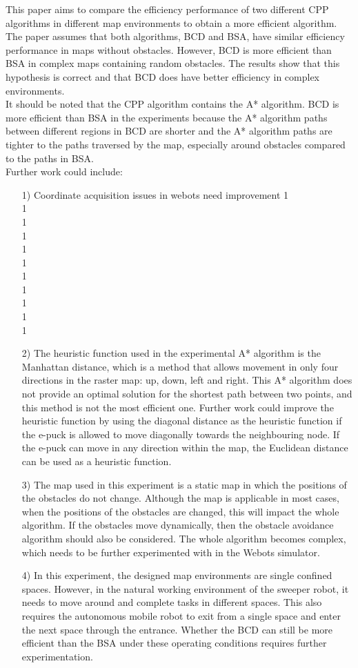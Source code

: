 \documentclass[conference]{IEEEtran}
\begin{document}
This paper aims to compare the efficiency performance of two different CPP algorithms in different map environments to obtain a more efficient algorithm. The paper assumes that both algorithms, BCD and BSA, have similar efficiency performance in maps without obstacles. However, BCD is more efficient than BSA in complex maps containing random obstacles. The results show that this hypothesis is correct and that BCD does have better efficiency in complex environments.\\
It should be noted that the CPP algorithm contains the A* algorithm. BCD is more efficient than BSA in the experiments because the A* algorithm paths between different regions in BCD are shorter and the A* algorithm paths are tighter to the paths traversed by the map, especially around obstacles compared to the paths in BSA.\\
Further work could include:
\begin{itemize}
  \item [1)] 
    Coordinate acquisition issues in webots need improvement
    1\\
    1\\
    1\\
    1\\
    1\\
    1\\
    1\\
    1\\
    1\\
    1\\
    1
  \item [2)]
    The heuristic function used in the experimental A* algorithm is the Manhattan distance, which is a method that allows movement in only four directions in the raster map: up, down, left and right. This A* algorithm does not provide an optimal solution for the shortest path between two points, and this method is not the most efficient one. Further work could improve the heuristic function by using the diagonal distance as the heuristic function if the e-puck is allowed to move diagonally towards the neighbouring node. If the e-puck can move in any direction within the map, the Euclidean distance can be used as a heuristic function.
  \item [3)]
    The map used in this experiment is a static map in which the positions of the obstacles do not change. Although the map is applicable in most cases, when the positions of the obstacles are changed, this will impact the whole algorithm. If the obstacles move dynamically, then the obstacle avoidance algorithm should also be considered. The whole algorithm becomes complex, which needs to be further experimented with in the Webots simulator.
  \item [4)]
    In this experiment, the designed map environments are single confined spaces. However, in the natural working environment of the sweeper robot, it needs to move around and complete tasks in different spaces. This also requires the autonomous mobile robot to exit from a single space and enter the next space through the entrance. Whether the BCD can still be more efficient than the BSA under these operating conditions requires further experimentation.
\end{itemize}



 

\end{document}
